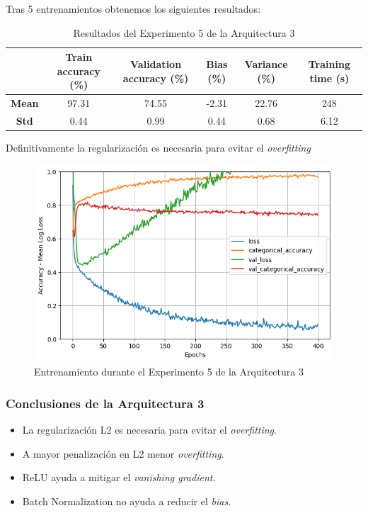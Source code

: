 \documentclass{article}
\begin{document}
			Tras 5 entrenamientos obtenemos los siguientes resultados:
			\begin{table}[!h]
				\begin{center}
					\begin{tabular}{ c | c | c | c | c | c |}
						\ & \textbf{Train accuracy (\%)} & \textbf{Validation accuracy (\%)} & \textbf{Bias (\%)} & \textbf{Variance (\%)} & \textbf{Training time (s)} \\ \hline
						\textbf{Mean} & 97.31 & 74.55 & -2.31 & 22.76 & 248 \\ \hline
						\textbf{Std} & 0.44 & 0.99 & 0.44 & 0.68 & 6.12 \\ \hline
					\end{tabular}
					\caption{Resultados del Experimento 5 de la Arquitectura 3}
					\label{tab:res-d-a3-e5}
				\end{center}
			\end{table}
			\newpage
			Definitivamente la regularizaci\'on es necesaria para evitar el \textit{overfitting}
			\begin{figure}[!h]
				\begin{center}
					\includegraphics[scale=0.5]{d-tr-a3-e5.png}		
					\caption{Entrenamiento durante el Experimento 5 de la Arquitectura 3}	
					\label{d-tr-a3-e5}
				\end{center}
			\end{figure}
		
		\subsubsection{Conclusiones de la Arquitectura 3}
		\label{d-cl-a3}
			\begin{itemize}
				\item La regularizaci\'on L2 es necesaria para evitar el \textit{overfitting}.
				\item A mayor penalizaci\'on en L2 menor \textit{overfitting}.
				\item ReLU ayuda a mitigar el \textit{vanishing gradient}.
				\item Batch Normalization no ayuda a reducir el \textit{bias}.
			\end{itemize}
			
\end{document}
